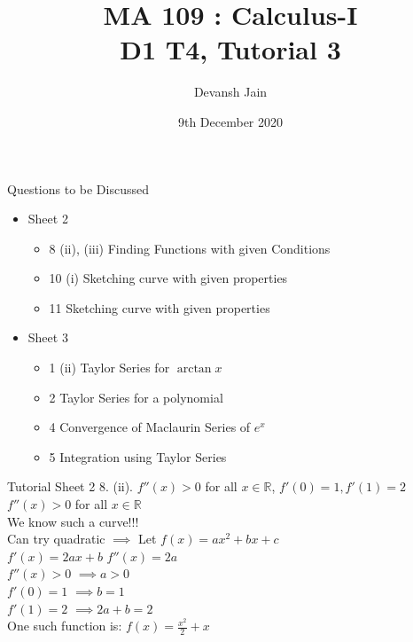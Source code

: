 \documentclass[aspectratio=169]{beamer}
\title{MA 109 : Calculus-I\\ D1 T4, Tutorial 3}
\author{Devansh Jain}
\date[09-12-2020]{9th December 2020}
\institute[IITB]{IIT Bombay}
\begin{document}
\begin{frame}
    \titlepage
\end{frame}

\begin{frame}{Questions to be Discussed}
    \begin{itemize}
        \item Sheet 2
            \begin{itemize}
                \item 8 (ii), (iii) Finding Functions with given Conditions
                \item 10 (i) Sketching curve with given properties
                \item 11 Sketching curve with given properties
            \end{itemize}
        \item Sheet 3
            \begin{itemize}
                \item 1 (ii) Taylor Series for $\arctan x$
                \item 2 Taylor Series for a polynomial
                \item 4 Convergence of Maclaurin Series of $e^x$
                \item 5 Integration using Taylor Series
            \end{itemize}
    \end{itemize}

\end{frame}

\begin{frame}{Tutorial Sheet 2}
    8. (ii). $f''(x) > 0$ for all $x \in \mathbb{R}$, $f'(0) = 1, f'(1) = 2$ \\
    \medskip
    $f''(x) > 0$ for all $x \in \mathbb{R}$ \\
    \medskip
    We know such a curve!!! \\
    \medskip
    Can try quadratic $\implies$ Let $f(x)=ax^2+bx+c$ \\
    $f'(x)=2ax+b$ \hspace{30pt} $f''(x)=2a$ \\
    \medskip
    $f''(x) > 0$  $\implies a>0$ \\
    $f'(0) = 1$ $\implies b=1$ \\
    $f'(1)=2$ $\implies 2a+b=2$ \\
    \medskip
    One such function is: $f(x)=\frac{x^2}{2}+x$ \\
\end{frame}
\end{document}
